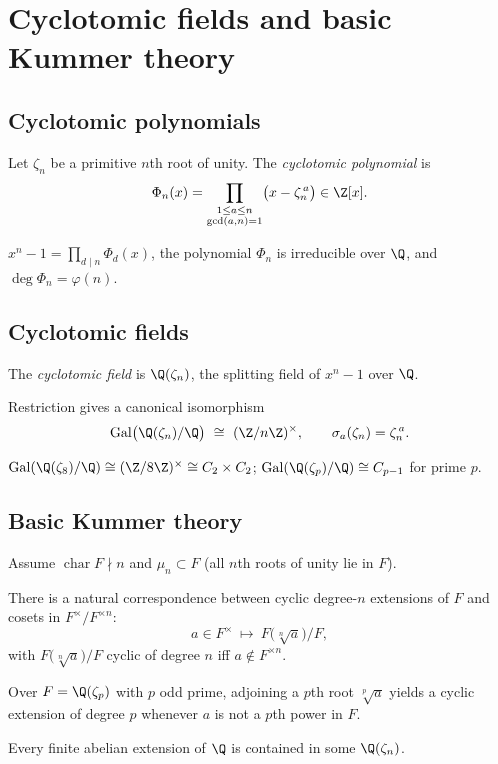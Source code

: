 \section{Cyclotomic fields and basic Kummer theory}\label{sec:cyclotomic-kummer}

\subsection{Cyclotomic polynomials}
\begin{definition}
Let $\zeta_n$ be a primitive $n$th root of unity. The \emph{cyclotomic polynomial} is
\[
\Phi_n(x)=\prod_{\substack{1\le a\le n\\ \gcd(a,n)=1}}\bigl(x-\zeta_n^{\,a}\bigr)\in\Z[x].
\]
\end{definition}
\begin{theorem}
$x^n-1=\prod_{d\mid n}\Phi_d(x)$, the polynomial $\Phi_n$ is irreducible over $\Q$, and $\deg\Phi_n=\varphi(n)$.
\end{theorem}

\subsection{Cyclotomic fields}
\begin{definition}
The \emph{cyclotomic field} is $\Q(\zeta_n)$, the splitting field of $x^n-1$ over $\Q$.
\end{definition}
\begin{theorem}
Restriction gives a canonical isomorphism
\[
\Gal\bigl(\Q(\zeta_n)/\Q\bigr)\ \cong\ (\Z/n\Z)^\times,\qquad
\sigma_a(\zeta_n)=\zeta_n^{\,a}.
\]
\end{theorem}
\begin{example}
$\Gal(\Q(\zeta_8)/\Q)\cong (\Z/8\Z)^\times\cong C_2\times C_2$; 
$\Gal(\Q(\zeta_p)/\Q)\cong C_{p-1}$ for prime $p$.
\end{example}

\subsection{Basic Kummer theory}
Assume $\operatorname{char}F\nmid n$ and $\mu_n\subset F$ (all $n$th roots of unity lie in $F$).
\begin{theorem}[Kummer]
There is a natural correspondence between cyclic degree-$n$ extensions of $F$ and cosets in $F^\times/F^{\times n}$:
\[
a\in F^\times\ \mapsto\ F\bigl(\sqrt[n]{a}\bigr)\!/F,
\]
with $F\bigl(\sqrt[n]{a}\bigr)/F$ cyclic of degree $n$ iff $a\notin F^{\times n}$.
\end{theorem}
\begin{example}
Over $F=\Q(\zeta_p)$ with $p$ odd prime, adjoining a $p$th root $\sqrt[p]{a}$ yields a cyclic extension of degree $p$ whenever $a$ is not a $p$th power in $F$.
\end{example}
\begin{remark}
Every finite abelian extension of $\Q$ is contained in some $\Q(\zeta_n)$.
\end{remark}
